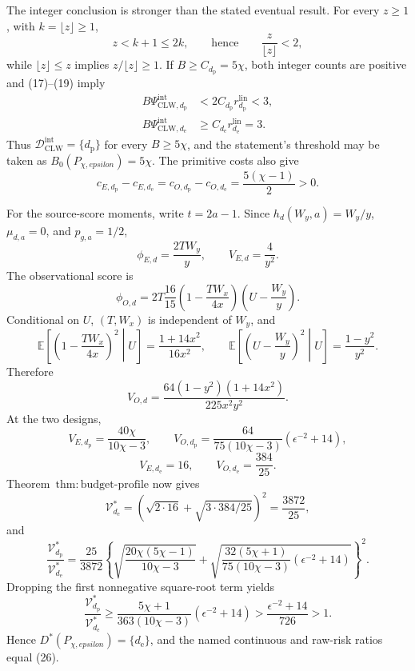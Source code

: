 The integer conclusion is stronger than the stated eventual result.  For every \(z\ge1\), with \(k=\lfloor z\rfloor\ge1\),
\[
 z<k+1\le2k,
 \qquad\text{hence}\qquad \frac z{\lfloor z\rfloor}<2,   \tag{19}
\]
while \(\lfloor z\rfloor\le z\) implies \(z/\lfloor z\rfloor\ge1\).  If \(B\ge C_{d_{\mathrm p}}=5\chi\), both integer counts are positive and (17)--(19) imply
\[
\begin{aligned}
 B\Psi_{\mathrm{CLW},d_{\mathrm p}}^{\mathrm{int}}
 &<2C_{d_{\mathrm p}}r_{d_{\mathrm p}}^{\mathrm{lin}}<3,\\
 B\Psi_{\mathrm{CLW},d_{\mathrm e}}^{\mathrm{int}}
 &\ge C_{d_{\mathrm e}}r_{d_{\mathrm e}}^{\mathrm{lin}}=3.
\end{aligned}                                               \tag{20}
\]
Thus \(\mathcal D_{\mathrm{CLW}}^{\mathrm{int}}=\{d_{\mathrm p}\}\) for every \(B\ge5\chi\), and the statement's threshold may be taken as \(B_0(P_{\chi,epsilon})=5\chi\).  The primitive costs also give
\[
 c_{E,d_{\mathrm p}}-c_{E,d_{\mathrm e}}
 =c_{O,d_{\mathrm p}}-c_{O,d_{\mathrm e}}
 =\frac{5(\chi-1)}2>0.                                    \tag{21}
\]

For the source-score moments, write \(t=2a-1\).  Since \(h_d(W_y,a)=W_y/y\), \(\mu_{d,a}=0\), and \(p_{g,a}=1/2\),
\[
 \phi_{E,d}=\frac{2TW_y}{y},
 \qquad V_{E,d}=\frac4{y^2}.                              \tag{22}
\]
The observational score is
\[
 \phi_{O,d}=2T\frac{16}{15}
 \left(1-\frac{TW_x}{4x}\right)
 \left(U-\frac{W_y}{y}\right).
\]
Conditional on \(U\), \((T,W_x)\) is independent of \(W_y\), and
\[
 \mathbb E\!\left[\left(1-\frac{TW_x}{4x}\right)^2\middle|U\right]
 =\frac{1+14x^2}{16x^2},
 \qquad
 \mathbb E\!\left[\left(U-\frac{W_y}{y}\right)^2\middle|U\right]
 =\frac{1-y^2}{y^2}.
\]
Therefore
\[
 V_{O,d}=\frac{64(1-y^2)(1+14x^2)}{225x^2y^2}.             \tag{23}
\]
At the two designs,
\[
 V_{E,d_{\mathrm p}}=\frac{40\chi}{10\chi-3},
 \qquad
 V_{O,d_{\mathrm p}}=
 \frac{64}{75(10\chi-3)}(\epsilon^{-2}+14),              \tag{24}
\]
\[
 V_{E,d_{\mathrm e}}=16,
 \qquad V_{O,d_{\mathrm e}}=\frac{384}{25}.
\]
Theorem~\(\mathrm{thm{:}budget\text{-}profile}\) now gives
\[
 \mathcal V_{d_{\mathrm e}}^*
 =\left(\sqrt{2\cdot16}+\sqrt{3\cdot384/25}\right)^2
 =\frac{3872}{25},                                        \tag{25}
\]
and
\[
 \frac{\mathcal V_{d_{\mathrm p}}^*}{\mathcal V_{d_{\mathrm e}}^*}
 =\frac{25}{3872}
 \left\{
 \sqrt{\frac{20\chi(5\chi-1)}{10\chi-3}}
 +\sqrt{\frac{32(5\chi+1)}{75(10\chi-3)}
 (\epsilon^{-2}+14)}
 \right\}^{2}.                                            \tag{26}
\]
Dropping the first nonnegative square-root term yields
\[
 \frac{\mathcal V_{d_{\mathrm p}}^*}{\mathcal V_{d_{\mathrm e}}^*}
 \ge\frac{5\chi+1}{363(10\chi-3)}(\epsilon^{-2}+14)
 >\frac{\epsilon^{-2}+14}{726}>1.                         \tag{27}
\]
Hence \(D^*(P_{\chi,epsilon})=\{d_{\mathrm e}\}\), and the named continuous and raw-risk ratios equal (26).

